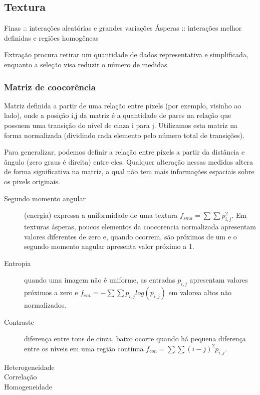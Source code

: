 \documentclass[twocolumn, 9pt]{article}
\begin{document}
\subsection*{Textura}
\label{sec:org48121c0}
Finas :: interações aleatórias e grandes variações
Ásperas :: interações melhor definidas e regiões homogêneas

Extração procura retirar um quantidade de dados representativa e simplificada, enquanto a seleção visa reduzir o número de medidas

\subsubsection*{Matriz de coocorência}
\label{sec:org9ab4d2b}
Matriz definida a partir de uma relação entre pixels (por exemplo, visinho ao lado), onde a posição i,j da matriz é a quantidade de pares na relação que possuem uma transição do nível de cinza i para j.
Utilizamos esta matriz na forma normalizada (dividindo cada elemento pelo número total de transições).

Para generalizar, podemos definir a relação entre pixels a partir da distância e ângulo (zero graus é direita) entre eles.
Qualquer alteração nessas medidas altera de forma significativa na matriz, a qual não tem mais informações espaciais sobre os pixels originais.

\begin{description}
\item[{Segundo momento angular}] (energia) expressa a uniformidade de uma textura \(f_{sma} = \sum \sum p_{i,j}^2\).
Em texturas ásperas, poucos elementos da coocorencia normalizada apresentam valores diferentes de zero e, quando ocorrem, são próximos de um e o segundo momento angular apresenta valor próximo a 1.
\item[{Entropia}] quando uma imagem não é uniforme, as entradas \(p_{i,j}\) apresentam valores próximos a zero e \(f_{ent} = - \sum \sum p_{i,j} log(p_{i,j})\) em valorea altos não normalizados.
\item[{Contraste}] diferença entre tons de cinza, baixo ocorre quando há pequena diferença entre os níveis  em uma região contínua \(f_{con} = \sum \sum (i-j)^2 p_{i,j}\).
\item[{Heterogeneidade}] 

\item[{Correlação}] 

\item[{Homogeneidade}] 
\end{description}
\end{document}
